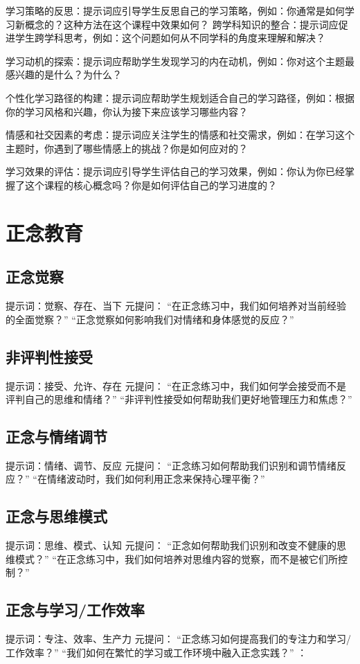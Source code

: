 \documentclass[12pt]{book}
\begin{document}
学习策略的反思：提示词应引导学生反思自己的学习策略，例如：你通常是如何学习新概念的？这种方法在这个课程中效果如何？
跨学科知识的整合：提示词应促进学生跨学科思考，例如：这个问题如何从不同学科的角度来理解和解决？

学习动机的探索：提示词应帮助学生发现学习的内在动机，例如：你对这个主题最感兴趣的是什么？为什么？

个性化学习路径的构建：提示词应帮助学生规划适合自己的学习路径，例如：根据你的学习风格和兴趣，你认为接下来应该学习哪些内容？

情感和社交因素的考虑：提示词应关注学生的情感和社交需求，例如：在学习这个主题时，你遇到了哪些情感上的挑战？你是如何应对的？

学习效果的评估：提示词应引导学生评估自己的学习效果，例如：你认为你已经掌握了这个课程的核心概念吗？你是如何评估自己的学习进度的？

\section{正念教育}
\subsection{正念觉察}
提示词：觉察、存在、当下
元提问：
“在正念练习中，我们如何培养对当前经验的全面觉察？”
“正念觉察如何影响我们对情绪和身体感觉的反应？”

\subsection{非评判性接受}
提示词：接受、允许、存在
元提问：
“在正念练习中，我们如何学会接受而不是评判自己的思维和情绪？”
“非评判性接受如何帮助我们更好地管理压力和焦虑？”


\subsection{正念与情绪调节}
提示词：情绪、调节、反应
元提问：
“正念练习如何帮助我们识别和调节情绪反应？”
“在情绪波动时，我们如何利用正念来保持心理平衡？”

\subsection{正念与思维模式}
提示词：思维、模式、认知
元提问：
“正念如何帮助我们识别和改变不健康的思维模式？”
“在正念练习中，我们如何培养对思维内容的觉察，而不是被它们所控制？”

\subsection{正念与学习/工作效率}
提示词：专注、效率、生产力
元提问：
“正念练习如何提高我们的专注力和学习/工作效率？”
“我们如何在繁忙的学习或工作环境中融入正念实践？”
：
\end{document}
